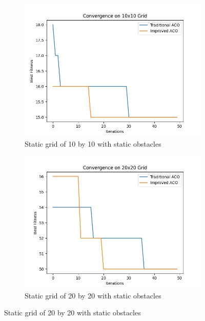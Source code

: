 \documentclass[conference]{IEEEtran}
\begin{document}
\begin{figure}[H]
    \centering
     \begin{subfigure}[b]{0.4\textwidth}
     \centering
         \includegraphics[width=\textwidth]{ACO_Convergence_10x10.png}
         \caption{Static grid of 10 by 10 with static obstacles}
         \label{fig:110}
     \end{subfigure}
     \hfill
     
     \begin{subfigure}[b]{0.4\textwidth}
     \centering
         \includegraphics[width=\textwidth]{ACO_Convergence_20x20.png}
         \caption{Static grid of 20 by 20 with static obstacles}
         \label{fig:111}
     \end{subfigure}
     

\end{figure}
\end{document}
